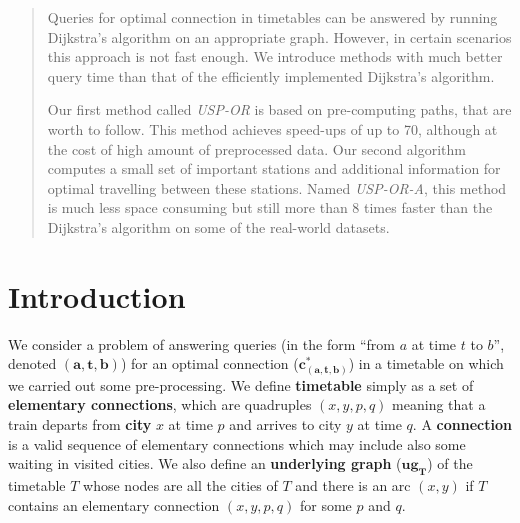 \documentclass{svk_long_en}
\newcommand{\indt}{\hspace{6ex}}
\begin{document}
	
	

	\maketitle

	\begin{abstract}
	Queries for optimal connection in timetables can be answered by running Dijkstra's algorithm on an appropriate graph. However, in certain scenarios this approach is not fast enough. We introduce methods with much better query time than that of the efficiently implemented Dijkstra's algorithm. 

	\indt Our first method called {\it USP-OR} is based on pre-computing paths, that are worth to follow. This method achieves speed-ups of up to 70, although at the cost of high amount of preprocessed data. Our second algorithm computes a small set of important stations and additional information for optimal travelling between these stations. Named {\it USP-OR-A}, this method is much less space consuming but still more than 8 times faster than the Dijkstra's algorithm on some of the real-world datasets.

	\end{abstract}

    
\section{Introduction}

	We consider a problem of answering queries (in the form ``from $a$ at time $t$ to $b$'', denoted $\bm{(a, t, b)}$) for an optimal connection ($\bm{c^{*}_{(a, t, b)}}$) in a timetable on which we carried out some pre-processing. We define \textbf{timetable} simply as a set of \textbf{elementary connections}, which are quadruples $(x, y, p, q)$ meaning that a train departs from \textbf{city} $x$ at time $p$ and arrives to city $y$ at time $q$. A \textbf{connection} is a valid sequence of elementary connections which may include also some waiting in visited cities. We also define an \textbf{underlying graph} ($\bm{ug_{T}}$) of the timetable $T$ whose nodes are all the cities of $T$ and there is an arc $(x, y)$ if $T$ contains an elementary connection $(x, y, p, q)$ for some $p$ and $q$.
\end{document}
